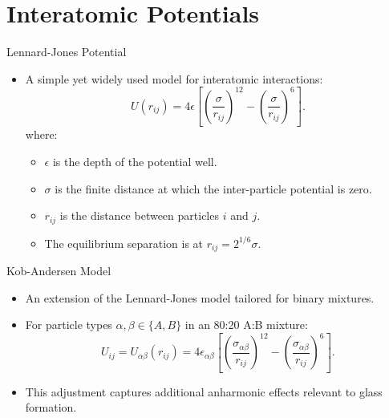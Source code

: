 \documentclass{beamer}
\begin{document}
\section{Interatomic Potentials}
\begin{frame}{Lennard-Jones Potential}
  \begin{itemize}
    \item A simple yet widely used model for interatomic interactions:
      \[
      U(r_{ij}) = 4\epsilon \left[\left(\frac{\sigma}{r_{ij}}\right)^{12} - \left(\frac{\sigma}{r_{ij}}\right)^6\right].
      \]
    where:
    \begin{itemize}
      \item \(\epsilon\) is the depth of the potential well.
      \item \(\sigma\) is the finite distance at which the inter-particle potential is zero.
      \item \(r_{ij}\) is the distance between particles \(i\) and \(j\).
      \item The equilibrium separation is at \(r_{ij}=2^{1/6}\sigma\).
    \end{itemize}
  \end{itemize}
\end{frame}

\begin{frame}{Kob-Andersen Model}
    \begin{itemize}
      \item An extension of the Lennard-Jones model tailored for binary mixtures.
      \item For particle types \(\alpha,\beta \in \{A,B\}\) in an 80:20 A:B mixture:
        \[
        U_{ij} = U_{\alpha\beta}(r_{ij}) = 4\epsilon_{\alpha\beta}\left[\left(\frac{\sigma_{\alpha\beta}}{r_{ij}}\right)^{12} - \left(\frac{\sigma_{\alpha\beta}}{r_{ij}}\right)^6\right].
        \]
      \item This adjustment captures additional anharmonic effects relevant to glass formation.
    \end{itemize}
\end{frame}

\end{document}
